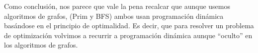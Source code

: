 Como conclusión, nos parece que vale la pena recalcar que aunque usemos algoritmos de grafos, (Prim y BFS) ambos usan programación dinámica basándose en el principio de optimalidad. Es decir, que para resolver un problema de optimización volvimos a recurrir a programación dinámica aunque ``oculto'' en los algoritmos de grafos.